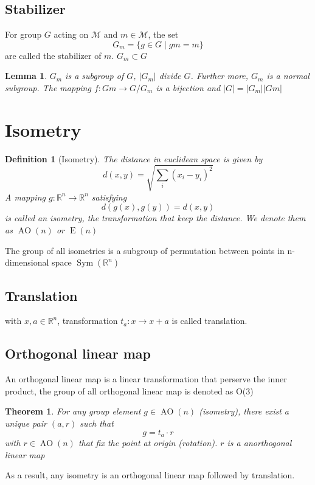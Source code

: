 \documentclass{amsart}
\newcommand{\setM}{\mathcal{M}}
\newtheorem{definition}{Definition}
\newtheorem{theorem}{Theorem}
\newtheorem{lemma}{Lemma}
\DeclareMathOperator{\AO}{AO}
\DeclareMathOperator{\E}{E}
\DeclareMathOperator{\Sym}{Sym}
\begin{document}
\subsection*{Stabilizer}
For group $G$ acting on $\setM$ and $m \in \setM$, the set 
\[G_m = \{ g\in G\mid gm = m \}\]
are called the stabilizer of $m$. $G_m \subset G$

\begin{lemma}
    $G_m$ is a subgroup of $G$, $|G_m|$ divide $G$. Further more, $G_m$ is a normal subgroup. 
    The mapping $f\colon Gm \to G/G_m$ is a bijection and $|G|=|G_m||Gm|$
\end{lemma}

\section*{Isometry}

\begin{definition}
    [Isometry]
    The distance in euclidean space is given by 
    \[
        d(x,y) = \sqrt{\sum_i(x_i-y_i)^2}    
    \]
    A mapping $g\colon \mathbb{R}^n \to \mathbb{R}^n$ satisfying 
    \[
        d(g(x),g(y)) = d(x,y)    
    \] is called an isometry, the transformation that keep the distance. We denote them as $\AO(n)$ or $\E(n)$
\end{definition}
The group of all isometries is a subgroup of permutation between points in n-dimensional space $\Sym(\mathbb{R}^n)$

\subsection*{Translation}
with $x, a \in \mathbb{R}^n$, transformation $t_a\colon x \to x+a$ is called translation.

\subsection*{Orthogonal linear map}
An orthogonal linear map is a linear transformation that perserve the inner product, the group of all
orthogonal linear map is denoted as O($3$)

\begin{theorem}
    For any group element $g\in \AO(n)$ (isometry), there exist a unique pair $(a,r)$ such that 
    \[g = t_a \cdot r\]
    with $r\in \AO(n)$ that fix the point at origin (rotation). $r$ is a anorthogonal linear map
\end{theorem}
As a result, any isometry is an orthogonal linear map followed by translation.
\end{document}
